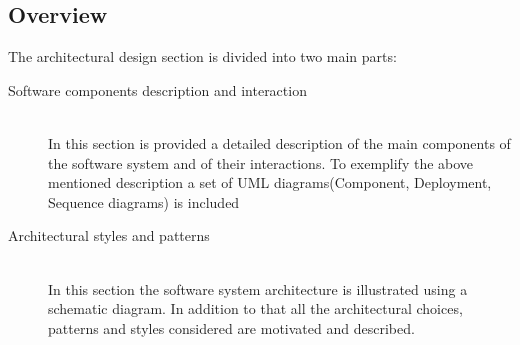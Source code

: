 \documentclass[11pt,titlepage]{article} %
\begin{document}
\subsection{Overview}
         The architectural design section is divided into two main parts:
	\begin{description}
	        \item [Software components description and interaction] \hfill \\
	            In this section is provided a detailed description of the main components of the software system
	            and of their interactions.
	            To exemplify the above mentioned description a set of UML diagrams(Component, Deployment, Sequence diagrams) is
	            included
	        \item [Architectural styles and patterns] \hfill \\
	            In this section the software system architecture is illustrated using a schematic diagram.
	            In addition to that all the architectural choices, patterns and styles considered are motivated and described.
	\end{description}
\end{document}
